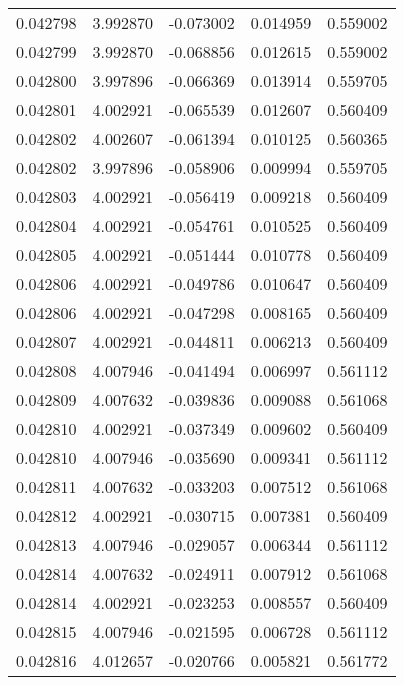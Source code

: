\begin{tabular}{lrrrr}
0.042798    &  3.992870 & -0.073002 &  0.014959 &             0.559002 \\
0.042799    &  3.992870 & -0.068856 &  0.012615 &             0.559002 \\
0.042800    &  3.997896 & -0.066369 &  0.013914 &             0.559705 \\
0.042801    &  4.002921 & -0.065539 &  0.012607 &             0.560409 \\
0.042802    &  4.002607 & -0.061394 &  0.010125 &             0.560365 \\
0.042802    &  3.997896 & -0.058906 &  0.009994 &             0.559705 \\
0.042803    &  4.002921 & -0.056419 &  0.009218 &             0.560409 \\
0.042804    &  4.002921 & -0.054761 &  0.010525 &             0.560409 \\
0.042805    &  4.002921 & -0.051444 &  0.010778 &             0.560409 \\
0.042806    &  4.002921 & -0.049786 &  0.010647 &             0.560409 \\
0.042806    &  4.002921 & -0.047298 &  0.008165 &             0.560409 \\
0.042807    &  4.002921 & -0.044811 &  0.006213 &             0.560409 \\
0.042808    &  4.007946 & -0.041494 &  0.006997 &             0.561112 \\
0.042809    &  4.007632 & -0.039836 &  0.009088 &             0.561068 \\
0.042810    &  4.002921 & -0.037349 &  0.009602 &             0.560409 \\
0.042810    &  4.007946 & -0.035690 &  0.009341 &             0.561112 \\
0.042811    &  4.007632 & -0.033203 &  0.007512 &             0.561068 \\
0.042812    &  4.002921 & -0.030715 &  0.007381 &             0.560409 \\
0.042813    &  4.007946 & -0.029057 &  0.006344 &             0.561112 \\
0.042814    &  4.007632 & -0.024911 &  0.007912 &             0.561068 \\
0.042814    &  4.002921 & -0.023253 &  0.008557 &             0.560409 \\
0.042815    &  4.007946 & -0.021595 &  0.006728 &             0.561112 \\
0.042816    &  4.012657 & -0.020766 &  0.005821 &             0.561772 \\

\end{tabular}
